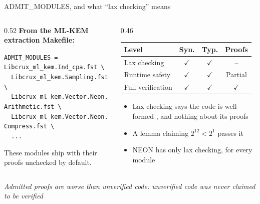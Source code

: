 \ifdefined\PRESENTATION\else\PassOptionsToClass{handout}{beamer}\fi\documentclass[aspectratio=169, lualatex]{beamer}
\begin{document}
\begin{frame}{ADMIT\_MODULES, and what ``lax checking'' means}
	\footnotesize
	\begin{columns}[t]
		\begin{column}{0.52\textwidth}
			\textbf{From the ML-KEM extraction Makefile:}
			\begin{flushleft}
				\scriptsize
				\texttt{ADMIT\_MODULES = Libcrux\_ml\_kem.Ind\_cpa.fst \textbackslash}\\
				\texttt{~~Libcrux\_ml\_kem.Sampling.fst \textbackslash}\\
				\texttt{~~Libcrux\_ml\_kem.Vector.Neon.Arithmetic.fst \textbackslash}\\
				\texttt{~~Libcrux\_ml\_kem.Vector.Neon.Compress.fst \textbackslash}\\
				\texttt{~~...}
			\end{flushleft}
			\vspace{0.1em}
			These modules ship with their proofs unchecked by default.
		\end{column}
		\begin{column}{0.46\textwidth}
			\begin{center}
				\small
				\begin{tabular}{|l|c|c|c|}
					\hline
					\textbf{Level}    & \textbf{Syn.} & \textbf{Typ.} & \textbf{Proofs} \\
					\hline
					Lax checking      & $\checkmark$  & $\checkmark$  & --              \\
					\hline
					Runtime safety    & $\checkmark$  & $\checkmark$  & Partial         \\
					\hline
					Full verification & $\checkmark$  & $\checkmark$  & $\checkmark$    \\
					\hline
				\end{tabular}
			\end{center}
			\vspace{0.2em}
			\small
			\begin{itemize}
				\item Lax checking says the code is well-formed \fstar, and nothing about its proofs
				\item A lemma claiming $2^{12} < 2^1$ passes it
				\item NEON has only lax checking, for every module
			\end{itemize}
		\end{column}
	\end{columns}
	\begin{center}
		\textit{Admitted proofs are worse than unverified code: unverified code was never claimed to be verified}
	\end{center}
\end{frame}
\end{document}
